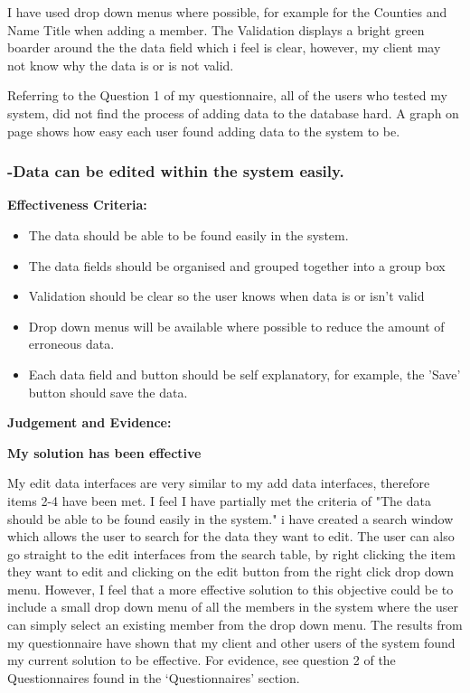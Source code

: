 I have used drop down menus where possible, for example for the Counties and Name Title when adding a member. The Validation displays a bright green boarder around the the data field which i feel is clear, however, my client may not know why the data is or is not valid.

Referring to the Question 1 of my questionnaire, all of the users who tested my system, did not find the process of adding data to the database hard. A graph on page \pageref{} shows how easy each user found adding data to the system to be.






\pagebreak
\subsubsection{-Data can be edited within the system easily.}

\textbf{Effectiveness Criteria:}\newline
\begin{itemize}
	\item{The data should be able to be found easily in the system.}
	\item{The data fields should be organised and grouped together into a group box}
	\item{Validation should be clear so the user knows when data is or isn't valid}
	\item{Drop down menus will be available where possible to reduce the amount of erroneous data.}
	\item{Each data field and button should be self explanatory, for example, the 'Save' button should save the data.}
\end{itemize}

\textbf{Judgement and Evidence:} \newline

\textbf{\large{My solution has been effective}}

 My edit data interfaces are very similar to my add data interfaces, therefore items 2-4 have been met. I feel I have partially met the criteria of "The data should be able to be found easily in the system." i have created a search window which allows the user to search for the data they want to edit. The user can also go straight to the edit interfaces from the search table, by right clicking the item they want to edit and clicking on the edit button from the right click drop down menu. However, I feel that a more effective solution to this objective could be to include a small drop down menu of all the members in the system where the user can simply select an existing member from the drop down menu. The results from my questionnaire have shown that my client and other users of the system found my current solution to be effective. For evidence, see question 2 of the Questionnaires found in the `Questionnaires' section.





